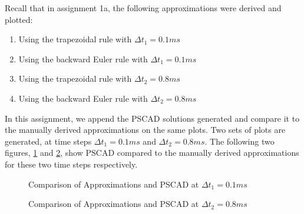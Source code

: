 \documentclass[10pt, oneside, letterpaper]{article}
\begin{document}
Recall that in assignment 1a, the following approximations were derived and plotted:

\begin{enumerate}[label=\alph*)]
  \item Using the trapezoidal rule with $\Delta{}t_1 = 0.1ms$
  \item Using the backward Euler rule with $\Delta{}t_1 = 0.1ms$
  \item Using the trapezoidal rule with $\Delta{}t_2 = 0.8ms$
  \item Using the backward Euler rule with $\Delta{}t_2 = 0.8ms$
\end{enumerate}

In this assignment, we append the PSCAD solutions generated and compare it to the manually derived approximations on the same plots. Two sets of plots are generated, at time steps $\Delta{}t_1 = 0.1ms$ and $\Delta{}t_2 = 0.8ms$. The following two figures, \ref{approx_pscad_comp_0p0001} and \ref{approx_pscad_comp_0p0008}, show PSCAD compared to the manually derived approximations for these two time steps respectively.

\begin{figure}[H]
    \begin{center}
        
    \end{center}
    \caption{Comparison of Approximations and PSCAD at $\Delta{}t_1 = 0.1 ms$}
    \label{approx_pscad_comp_0p0001}
\end{figure}

\begin{figure}[H]
    \begin{center}
        
    \end{center}
    \caption{Comparison of Approximations and PSCAD at $\Delta{}t_2 = 0.8 ms$}
    \label{approx_pscad_comp_0p0008}
\end{figure}
\end{document}
